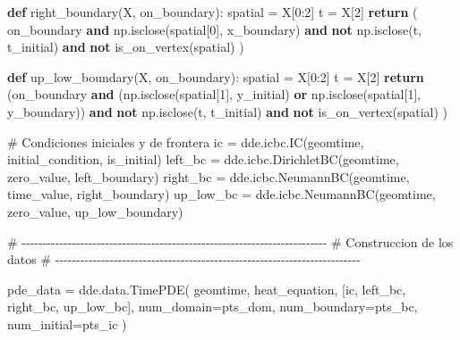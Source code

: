 \documentclass[
  spanish,
  us-letterpaper,
]{scrreprt}
\newenvironment{Shaded}{\begin{snugshade}}{\end{snugshade}}
\newcommand{\CommentTok}[1]{\textcolor[rgb]{0.37,0.37,0.37}{#1}}
\newcommand{\ControlFlowTok}[1]{\textcolor[rgb]{0.00,0.23,0.31}{\textbf{#1}}}
\newcommand{\DecValTok}[1]{\textcolor[rgb]{0.68,0.00,0.00}{#1}}
\newcommand{\KeywordTok}[1]{\textcolor[rgb]{0.00,0.23,0.31}{\textbf{#1}}}
\newcommand{\NormalTok}[1]{\textcolor[rgb]{0.00,0.23,0.31}{#1}}
\newcommand{\OperatorTok}[1]{\textcolor[rgb]{0.37,0.37,0.37}{#1}}
\theoremstyle{plain}
\theoremstyle{definition}
\theoremstyle{remark}
\begin{document}
\begin{Shaded}
\begin{Highlighting}[]
\KeywordTok{def}\NormalTok{ right\_boundary(X, on\_boundary):}
\NormalTok{    spatial }\OperatorTok{=}\NormalTok{ X[}\DecValTok{0}\NormalTok{:}\DecValTok{2}\NormalTok{]}
\NormalTok{    t }\OperatorTok{=}\NormalTok{ X[}\DecValTok{2}\NormalTok{]}
    \ControlFlowTok{return}\NormalTok{ (}
\NormalTok{        on\_boundary }
        \KeywordTok{and}\NormalTok{ np.isclose(spatial[}\DecValTok{0}\NormalTok{], x\_boundary) }
        \KeywordTok{and} \KeywordTok{not}\NormalTok{ np.isclose(t, t\_initial) }
        \KeywordTok{and} \KeywordTok{not}\NormalTok{ is\_on\_vertex(spatial)}
\NormalTok{    )}

\KeywordTok{def}\NormalTok{ up\_low\_boundary(X, on\_boundary):}
\NormalTok{    spatial }\OperatorTok{=}\NormalTok{ X[}\DecValTok{0}\NormalTok{:}\DecValTok{2}\NormalTok{]}
\NormalTok{    t }\OperatorTok{=}\NormalTok{ X[}\DecValTok{2}\NormalTok{]}
    \ControlFlowTok{return}\NormalTok{ (on\_boundary }
    \KeywordTok{and}\NormalTok{ (np.isclose(spatial[}\DecValTok{1}\NormalTok{], y\_initial) }
    \KeywordTok{or}\NormalTok{ np.isclose(spatial[}\DecValTok{1}\NormalTok{], y\_boundary)) }
    \KeywordTok{and} \KeywordTok{not}\NormalTok{ np.isclose(t, t\_initial) }
    \KeywordTok{and} \KeywordTok{not}\NormalTok{ is\_on\_vertex(spatial)}
\NormalTok{    )}

\CommentTok{\# Condiciones iniciales y de frontera}
\NormalTok{ic }\OperatorTok{=}\NormalTok{ dde.icbc.IC(geomtime, initial\_condition, is\_initial)}
\NormalTok{left\_bc }\OperatorTok{=}\NormalTok{ dde.icbc.DirichletBC(geomtime, }
\NormalTok{                                zero\_value, left\_boundary)}
\NormalTok{right\_bc }\OperatorTok{=}\NormalTok{ dde.icbc.NeumannBC(geomtime,}
\NormalTok{                                time\_value, right\_boundary)}
\NormalTok{up\_low\_bc }\OperatorTok{=}\NormalTok{ dde.icbc.NeumannBC(geomtime, }
\NormalTok{                                zero\_value, up\_low\_boundary)}

\CommentTok{\# {-}{-}{-}{-}{-}{-}{-}{-}{-}{-}{-}{-}{-}{-}{-}{-}{-}{-}{-}{-}{-}{-}{-}{-}{-}{-}{-}{-}{-}{-}{-}{-}{-}{-}{-}{-}{-}{-}{-}{-}{-}{-}{-}{-}{-}{-}{-}{-}{-}{-}{-}{-}{-}{-}{-}{-}{-}{-}{-}{-}{-}{-}{-}{-}{-}{-}{-}{-}{-}{-}{-}{-}{-}}
\CommentTok{\# Construccion de los datos}
\CommentTok{\# {-}{-}{-}{-}{-}{-}{-}{-}{-}{-}{-}{-}{-}{-}{-}{-}{-}{-}{-}{-}{-}{-}{-}{-}{-}{-}{-}{-}{-}{-}{-}{-}{-}{-}{-}{-}{-}{-}{-}{-}{-}{-}{-}{-}{-}{-}{-}{-}{-}{-}{-}{-}{-}{-}{-}{-}{-}{-}{-}{-}{-}{-}{-}{-}{-}{-}{-}{-}{-}{-}{-}{-}{-}}

\NormalTok{pde\_data }\OperatorTok{=}\NormalTok{ dde.data.TimePDE(}
\NormalTok{    geomtime,}
\NormalTok{    heat\_equation,}
\NormalTok{    [ic, left\_bc, right\_bc, up\_low\_bc],}
\NormalTok{    num\_domain}\OperatorTok{=}\NormalTok{pts\_dom,}
\NormalTok{    num\_boundary}\OperatorTok{=}\NormalTok{pts\_bc,}
\NormalTok{    num\_initial}\OperatorTok{=}\NormalTok{pts\_ic }
\NormalTok{)}


\end{Highlighting}
\end{Shaded}
\end{document}

